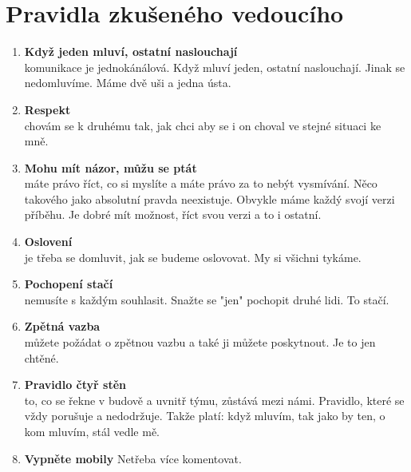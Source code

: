 \documentclass[a4paper,12pt,final]{report}
\begin{document}
\section{Pravidla zkušeného vedoucího}
\begin{enumerate}
 \item \textbf{Když jeden mluví, ostatní naslouchají} \\
 komunikace je jednokánálová. Když mluví jeden, ostatní naslouchají. Jinak se nedomluvíme. Máme dvě uši a jedna ústa.
 \item \textbf{Respekt}\\
 chovám se k druhému tak, jak chci aby se i on choval ve stejné situaci ke mně.
 \item \textbf{Mohu mít názor, můžu se ptát} \\
 máte právo říct, co si myslíte a máte právo za to nebýt vysmívání. Něco takového jako absolutní pravda neexistuje. Obvykle máme každý svojí verzi příběhu. Je dobré mít možnost, říct svou verzi a to i ostatní.
 \item \textbf{Oslovení}\\
 je třeba se domluvit, jak se budeme oslovovat. My si všichni tykáme. 
 \item \textbf{Pochopení stačí}\\
 nemusíte s každým souhlasit. Snažte se "jen" pochopit druhé lidi. To stačí.
 \item \textbf{Zpětná vazba} \\
 můžete požádat o zpětnou vazbu a také ji můžete poskytnout. Je to jen chtěné.
 \item \textbf{Pravidlo čtyř stěn} \\
 to, co se řekne v budově a uvnitř týmu, zůstává mezi námi. Pravidlo, které se vždy porušuje a nedodržuje. Takže platí: když mluvím, tak jako by ten, o kom mluvím, stál vedle mě.
 \item \textbf{Vypněte mobily} Netřeba více komentovat.
\end{enumerate}
\end{document}
